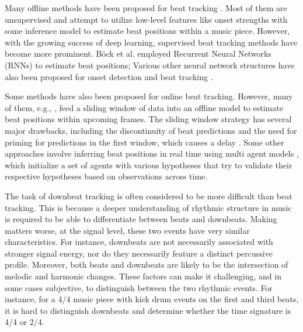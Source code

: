 \documentclass{article}
\begin{document}
Many offline methods have been proposed for beat tracking \cite{ellis,davis,gouyon}. Most of them are unsupervised and attempt to utilize low-level features like onset strengths with some inference model to estimate beat positions within a music piece. However, with the growing success of deep learning, supervised beat tracking methods have become more prominent. Böck et al. \cite{Bock:2} employed Recurrent Neural Networks (RNNs) to estimate beat positions; Various other neural network structures have also been proposed for onset detection and beat tracking \cite{davis:2,Bock:3}. 

Some methods have also been proposed for online beat tracking. However, many of them, e.g., \cite{davis:3,Gkiokas,Brossier,Bock:2,mottaghi}, feed a sliding window of data into an offline model to estimate beat positions within upcoming frames. The sliding window strategy has several major drawbacks, including the discontinuity of beat predictions and the need for priming for predictions in the first window, which causes a delay \cite{Oliveria}. Some other approaches involve inferring beat positions in real time using multi agent models \cite{goto,goto:2,goto:3,Oliveria}, which initialize a set of agents with various hypotheses that try to validate their respective hypotheses based on observations across time.

The task of downbeat tracking is often considered to be more difficult than beat tracking. This is because a deeper understanding of rhythmic structure in music is required to be able to differentiate between beats and downbeats. Making matters worse, at the signal level, these two events have very similar characteristics. For instance, downbeats are not necessarily associated with stronger signal energy, nor do they necessarily feature a distinct percussive profile. Moreover, both beats and downbeats are likely to be the intersection of melodic and harmonic changes. These factors can make it challenging, and in some cases subjective, to distinguish between the two rhythmic events. For instance, for a 4/4 music piece with kick drum events on the first and third beats, it is hard to distinguish downbeats and determine whether the time signature is 4/4 or 2/4.  
\end{document}
